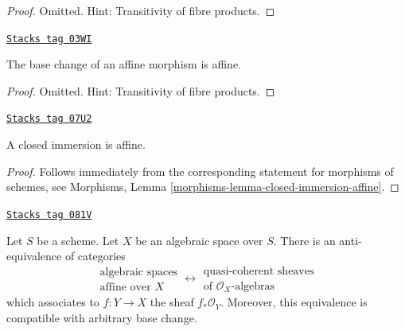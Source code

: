 \begin{proof}
Omitted. Hint: Transitivity of fibre products.
\end{proof}

\begin{lemma}
\label{spaces-morphisms-lemma-base-change-affine}
\href{https://stacks.math.columbia.edu/tag/03WI}{\texttt{Stacks tag 03WI}}

The base change of an affine morphism is affine.
\end{lemma}

\begin{proof}
Omitted. Hint: Transitivity of fibre products.
\end{proof}

\begin{lemma}
\label{spaces-morphisms-lemma-closed-immersion-affine}
\href{https://stacks.math.columbia.edu/tag/07U2}{\texttt{Stacks tag 07U2}}

A closed immersion is affine.
\end{lemma}

\begin{proof}
Follows immediately from the corresponding statement for morphisms of
schemes, see Morphisms, Lemma \ref{morphisms-lemma-closed-immersion-affine}.
\end{proof}

\begin{lemma}
\label{spaces-morphisms-lemma-affine-equivalence-algebras}
\href{https://stacks.math.columbia.edu/tag/081V}{\texttt{Stacks tag 081V}}

Let $S$ be a scheme. Let $X$ be an algebraic space over $S$.
There is an anti-equivalence of categories
$$
\begin{matrix}
\text{algebraic spaces} \\
\text{affine over }X
\end{matrix}
\longleftrightarrow
\begin{matrix}
\text{quasi-coherent sheaves} \\
\text{of }\mathcal{O}_X\text{-algebras}
\end{matrix}
$$
which associates to $f : Y \to X$ the sheaf $f_*\mathcal{O}_Y$.
Moreover, this equivalence is compatible with arbitrary base change.
\end{lemma}

